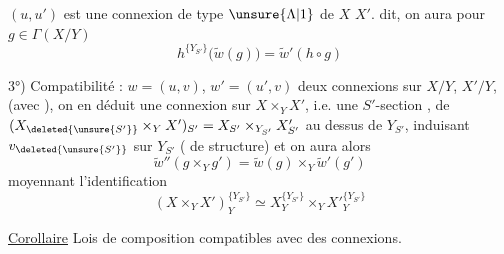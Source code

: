$(u,u')$ est une connexion de type $\unsure{\Lambda|1}$ de $X$  $X'$.  dit, on aura pour $g\in\Gamma(X/Y)$
\[
 h^{\{Y_{S'}\}}\bigl(\widetilde w(g)\bigr)=\widetilde w'(h\circ g)
\]

3°) Compatibilité  :  $w=(u,v)$, $w'=(u',v)$ deux connexions sur $X/Y$, $X'/Y$, (avec ), on en déduit une connexion sur $X\times_Y X'$,  i.e. une $S'$-section ,  de $(X_{\deleted{\unsure{S'}}}\times_Y X')_{S'}=X_{S'}\times_{Y_{S'}}X'_{S'}$ au dessus de $Y_{S'}$, induisant $v_{\deleted{\unsure{S'}}}$ sur $Y_{S'}$ ( de structure)  et on aura alors
\[
 \widetilde w''(g\times_Yg')=\widetilde w(g)\times_Y\widetilde w'(g')
\]
moyennant l'identification
\[
 (X\times_YX')^{\{Y_{S'}\}}_Y\simeq X^{\{Y_{S'}\}}_Y\times_Y X'^{\{Y_{S'}\}}_Y
\]

\uline{Corollaire} Lois de composition compatibles avec des connexions.



